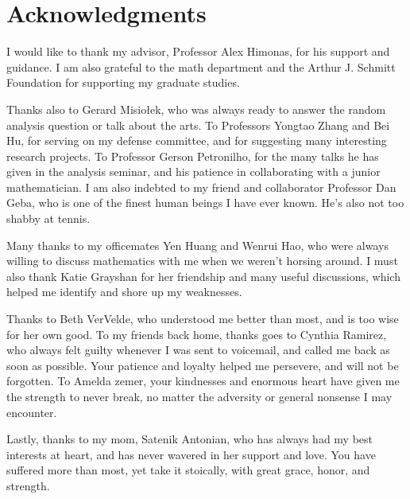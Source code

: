 \chapter*{Acknowledgments}
I would like to thank my advisor, Professor Alex Himonas,
for his support and guidance. I am also grateful to the math department and the  Arthur J. Schmitt
Foundation for supporting my graduate studies. 

Thanks also to Gerard Misio{\l}ek, who was always ready to answer the
random analysis question or talk about the arts. To Professors Yongtao
Zhang and Bei Hu, for serving on my defense committee, and for suggesting
many interesting research projects. To Professor Gerson
Petronilho, for the many talks he has given in the analysis seminar, and
his patience in collaborating with a junior mathematician. I am also
indebted to my friend and collaborator Professor Dan Geba, who is one of
the finest human beings I have ever known. He's also not too shabby at
tennis. 

Many thanks to my officemates Yen Huang and Wenrui Hao, who were always
willing to discuss mathematics with me when we weren't horsing around. I
must also thank Katie Grayshan for her friendship and many useful
discussions, which helped me identify and shore up my weaknesses. 

Thanks to Beth VerVelde, who understood me better than most, and is too
wise for her own good. To my friends back home, thanks goes to Cynthia
Ramirez, who always felt guilty whenever I was sent to voicemail, and
called me back as soon as possible. Your patience and loyalty helped me
persevere, and will not be forgotten. To Amelda zemer, your kindnesses and
enormous heart have given me the strength to never break, no matter the
adversity or general nonsense I may encounter.

Lastly, thanks to my mom, Satenik Antonian, who has always had my best
interests at heart, and has never wavered in her support and love. You have
suffered more than most, yet take it stoically, with great grace, honor,
and strength.    

